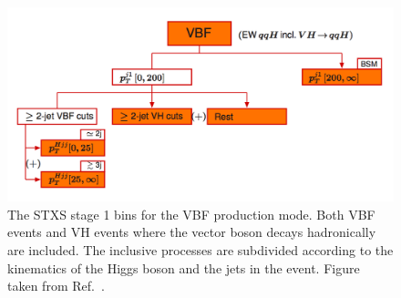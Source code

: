 \begin{figure}[hptb]
  \centering
  \includegraphics[width=\textwidth]{Figures/Theory/stage1VBF.png}
  \caption[Stage 1 STXS bins for the VBF production mode.]
  {
    The STXS stage 1 bins for the VBF production mode.
    Both VBF events and VH events where the vector boson decays hadronically are included.
    The inclusive processes are subdivided according to the kinematics of the Higgs boson 
    and the jets in the event.
    Figure taken from Ref.~\cite{YR4}.
  }
  \label{fig:theory_stage1VBF}
\end{figure}
